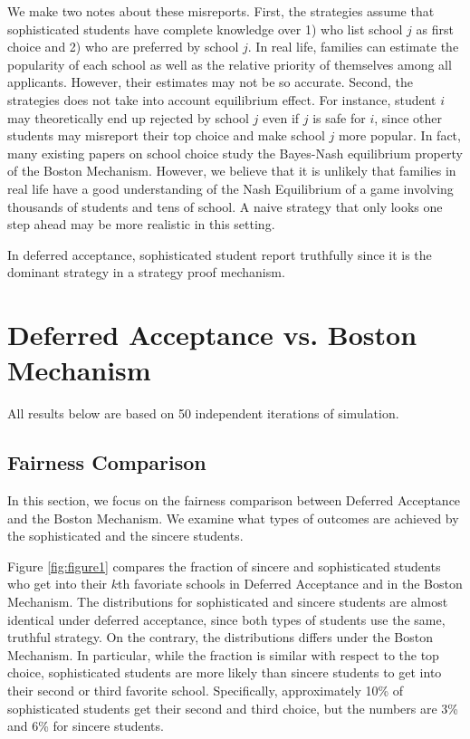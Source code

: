\documentclass{article}
\begin{document}
We make two notes about these misreports. First, the strategies assume that sophisticated students have complete knowledge over 1) who list school $j$ as first choice and 2) who are preferred by school $j$. In real life, families can estimate the popularity of each school as well as the relative priority of themselves among all applicants. However, their estimates may not be so accurate. Second, the strategies does not take into account equilibrium effect. For instance, student $i$ may theoretically end up rejected by school $j$ even if $j$ is safe for $i$, since other students may misreport their top choice and make school $j$ more popular. In fact, many existing papers on school choice study the Bayes-Nash equilibrium property of the Boston Mechanism. However, we believe that it is unlikely that families in real life have a good understanding of the Nash Equilibrium of a game involving thousands of students and tens of school. A naive strategy that only looks one step ahead may be more realistic in this setting. 

In deferred acceptance, sophisticated student report truthfully since it is the dominant strategy in a strategy proof mechanism. 

\section{Deferred Acceptance vs. Boston Mechanism}
All results below are based on 50 independent iterations of simulation. 

\subsection{Fairness Comparison}
In this section, we focus on the fairness comparison between Deferred Acceptance and the Boston Mechanism. We examine what types of outcomes are achieved by the sophisticated and the sincere students. 

Figure \ref{fig:figure1} compares the fraction of sincere and sophisticated students who get into their $k$th favoriate schools in Deferred Acceptance and in the Boston Mechanism. The distributions for sophisticated and sincere students are almost identical under deferred acceptance, since both types of students use the same, truthful strategy. On the contrary, the distributions differs under the Boston Mechanism. In particular, while the fraction is similar with respect to the top choice, sophisticated students are more likely than sincere students to get into their second or third favorite school. Specifically, approximately 10\% of sophisticated students get their second and third choice, but the numbers are 3\% and 6\% for sincere students. 
\end{document}
